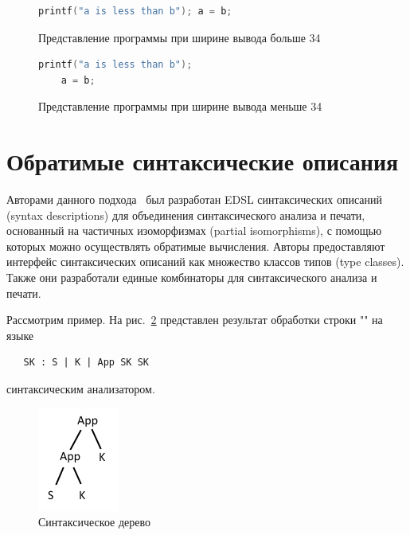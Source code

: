 \begin{figure}[h]
  \centering
  \begin{minipage}[h]{0.4\textwidth}
    \begin{lstlisting}[language=C]
printf("a is less than b"); a = b;
    \end{lstlisting}
    \caption{Представление программы при ширине вывода больше 34}
    \label{lol1}
  \end{minipage}
  \hfill
  \begin{minipage}[h]{0.4\textwidth}
    \begin{lstlisting}[language = C]
printf("a is less than b"); 
    a = b;
    \end{lstlisting}
    \caption{Представление программы при ширине вывода меньше 34}
    \label{lol2}
  \end{minipage}
\end{figure}

\section{Обратимые синтаксические описания}

Авторами данного подхода~\cite{Rendel} был разработан EDSL синтаксических описаний (syntax descriptions) 
для объединения синтаксического анализа и печати, основанный на частичных изоморфизмах 
(partial isomorphisms), с помощью которых можно осуществлять обратимые вычисления. 
Авторы предоставляют интерфейс синтаксических описаний как множество классов типов (type classes). 
Также они разработали единые комбинаторы для синтаксического анализа и печати.

Рассмотрим пример. На рис.~\ref{AST} представлен результат обработки строки "" на языке 

\begin{verbatim}
   SK : S | K | App SK SK
\end{verbatim}

синтаксическим анализатором.

\begin{figure}[h]
  \centering
  \includegraphics[scale = 0.9]{Aliev/AST.png}
  \caption{Синтаксическое дерево}
  \label{AST}
\end{figure}

